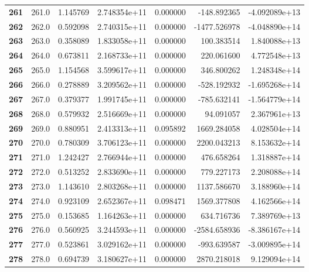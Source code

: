 \documentclass{report}[12pt]
\begin{document}
\begin{center}
\begin{tabular}{lrrrrrr}
\textbf{261 } &          261.0 &   1.145769 &  2.748354e+11 &    0.000000 &  -148.892365 & -4.092089e+13 \\
\textbf{262 } &          262.0 &   0.592098 &  2.740315e+11 &    0.000000 & -1477.526978 & -4.048890e+14 \\
\textbf{263 } &          263.0 &   0.358089 &  1.833058e+11 &    0.000000 &   100.383514 &  1.840088e+13 \\
\textbf{264 } &          264.0 &   0.673811 &  2.168733e+11 &    0.000000 &   220.061600 &  4.772548e+13 \\
\textbf{265 } &          265.0 &   1.154568 &  3.599617e+11 &    0.000000 &   346.800262 &  1.248348e+14 \\
\textbf{266 } &          266.0 &   0.278889 &  3.209562e+11 &    0.000000 &  -528.192932 & -1.695268e+14 \\
\textbf{267 } &          267.0 &   0.379377 &  1.991745e+11 &    0.000000 &  -785.632141 & -1.564779e+14 \\
\textbf{268 } &          268.0 &   0.579932 &  2.516669e+11 &    0.000000 &    94.091057 &  2.367961e+13 \\
\textbf{269 } &          269.0 &   0.880951 &  2.413313e+11 &    0.095892 &  1669.284058 &  4.028504e+14 \\
\textbf{270 } &          270.0 &   0.780309 &  3.706123e+11 &    0.000000 &  2200.043213 &  8.153632e+14 \\
\textbf{271 } &          271.0 &   1.242427 &  2.766944e+11 &    0.000000 &   476.658264 &  1.318887e+14 \\
\textbf{272 } &          272.0 &   0.513252 &  2.833690e+11 &    0.000000 &   779.227173 &  2.208088e+14 \\
\textbf{273 } &          273.0 &   1.143610 &  2.803268e+11 &    0.000000 &  1137.586670 &  3.188960e+14 \\
\textbf{274 } &          274.0 &   0.923109 &  2.652367e+11 &    0.098471 &  1569.377808 &  4.162566e+14 \\
\textbf{275 } &          275.0 &   0.153685 &  1.164263e+11 &    0.000000 &   634.716736 &  7.389769e+13 \\
\textbf{276 } &          276.0 &   0.560925 &  3.244593e+11 &    0.000000 & -2584.658936 & -8.386167e+14 \\
\textbf{277 } &          277.0 &   0.523861 &  3.029162e+11 &    0.000000 &  -993.639587 & -3.009895e+14 \\
\textbf{278 } &          278.0 &   0.694739 &  3.180627e+11 &    0.000000 &  2870.218018 &  9.129094e+14 \\

\end{tabular}
\end{center}
\end{document}
